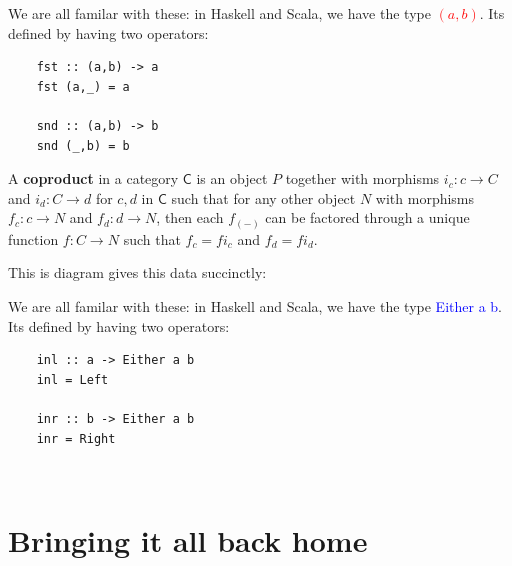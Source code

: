 \documentclass[tikz]{beamer}
\newcommand{\cat}[1]{\bm{ \mathsf{#1} }}
\newcommand{\cc}{\cat{C}}
\newcommand{\mred}[1]{\textcolor{red}{$#1$}}
\newcommand{\blue}[1]{\textcolor{blue}{#1}}
\theoremstyle{definition}
\begin{document}
\begin{frame}[fragile]
	We are all familar with these: in Haskell and Scala, we have the type \mred{(a, b)}. Its defined by having two operators: 
	
	\begin{verbatim}
	fst :: (a,b) -> a
	fst (a,_) = a
	
	snd :: (a,b) -> b
	snd (_,b) = b
	\end{verbatim}
\end{frame}

\frame
{ 
	\begin{definition}[Coroduct]
	
		A \textbf{coproduct} in a category $\cc$ is an object $P$ together with morphisms $i_c : c \to C $ and $i_d : C \to d$ for $c,d$ in $\cc$ such that for any other object $N$ with morphisms $f_c : c \to N$ and $f_d : d \to N$, then each $f_{(-)}$ can be factored through a unique function $f : C \to N$ such that $f_c = fi_c$ and $f_d = fi_d$. 
	\end{definition}
	
}

\begin{frame}[fragile]
	This is diagram gives this data succinctly: 
	
	\begin{center}
	\end{center}
\end{frame}

\begin{frame}[fragile]
	We are all familar with these: in Haskell and Scala, we have the type \blue{Either} \blue{a} \blue{b}. Its defined by having two operators: 
	
	\begin{verbatim}
	inl :: a -> Either a b
	inl = Left
	
	inr :: b -> Either a b
	inr = Right
	\end{verbatim}
\end{frame}

\
\section{Bringing it all back home}
\end{document}
